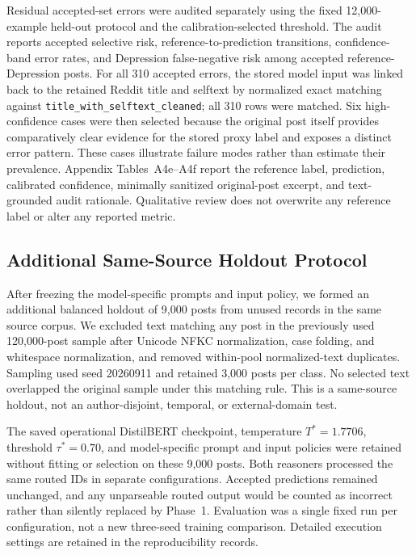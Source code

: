 \documentclass{ieeeaccess}
\begin{document}
Residual accepted-set errors were audited separately using the fixed 12,000-example held-out protocol and the calibration-selected threshold. The audit reports accepted selective risk, reference-to-prediction transitions, confidence-band error rates, and Depression false-negative risk among accepted reference-Depression posts. For all 310 accepted errors, the stored model input was linked back to the retained Reddit title and selftext by normalized exact matching against \texttt{title\_with\_selftext\_cleaned}; all 310 rows were matched. Six high-confidence cases were then selected because the original post itself provides comparatively clear evidence for the stored proxy label and exposes a distinct error pattern. These cases illustrate failure modes rather than estimate their prevalence. Appendix Tables~A4e--A4f report the reference label, prediction, calibrated confidence, minimally sanitized original-post excerpt, and text-grounded audit rationale. Qualitative review does not overwrite any reference label or alter any reported metric.

\subsection{Additional Same-Source Holdout Protocol}
\label{sec:additional-holdout-protocol}

After freezing the model-specific prompts and input policy, we formed an additional balanced holdout of 9,000 posts from unused records in the same source corpus. We excluded text matching any post in the previously used 120,000-post sample after Unicode NFKC normalization, case folding, and whitespace normalization, and removed within-pool normalized-text duplicates. Sampling used seed 20260911 and retained 3,000 posts per class. No selected text overlapped the original sample under this matching rule. This is a same-source holdout, not an author-disjoint, temporal, or external-domain test.

The saved operational DistilBERT checkpoint, temperature $T^*=1.7706$, threshold $\tau^*=0.70$, and model-specific prompt and input policies were retained without fitting or selection on these 9,000 posts. Both reasoners processed the same routed IDs in separate configurations. Accepted predictions remained unchanged, and any unparseable routed output would be counted as incorrect rather than silently replaced by Phase~1. Evaluation was a single fixed run per configuration, not a new three-seed training comparison. Detailed execution settings are retained in the reproducibility records.
\end{document}
